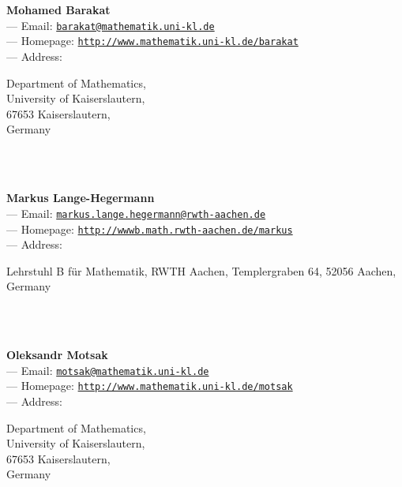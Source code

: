 \documentclass[a4paper,11pt]{report}
\begin{document}
\begin{titlepage}
\mbox{}\\
{\mbox{}\\
\small \noindent \textbf{Mohamed Barakat\\
    } --- Email: \href{mailto://barakat@mathematik.uni-kl.de} {\texttt{barakat@mathematik.uni-kl.de}}\\
 --- Homepage: \href{http://www.mathematik.uni-kl.de/~barakat} {\texttt{http://www.mathematik.uni-kl.de/\texttt{}barakat}}\\
 --- Address: \begin{minipage}[t]{8cm}\noindent
 Department of Mathematics, \\
 University of Kaiserslautern, \\
 67653 Kaiserslautern, \\
 Germany \end{minipage}
}\\
{\mbox{}\\
\small \noindent \textbf{Markus Lange-Hegermann\\
    } --- Email: \href{mailto://markus.lange.hegermann@rwth-aachen.de} {\texttt{markus.lange.hegermann@rwth-aachen.de}}\\
 --- Homepage: \href{http://wwwb.math.rwth-aachen.de/~markus} {\texttt{http://wwwb.math.rwth-aachen.de/\texttt{}markus}}\\
 --- Address: \begin{minipage}[t]{8cm}\noindent
 Lehrstuhl B f{\"u}r Mathematik, RWTH Aachen, Templergraben 64, 52056 Aachen,
Germany \end{minipage}
}\\
{\mbox{}\\
\small \noindent \textbf{Oleksandr Motsak\\
    } --- Email: \href{mailto://motsak@mathematik.uni-kl.de} {\texttt{motsak@mathematik.uni-kl.de}}\\
 --- Homepage: \href{http://www.mathematik.uni-kl.de/~motsak} {\texttt{http://www.mathematik.uni-kl.de/\texttt{}motsak}}\\
 --- Address: \begin{minipage}[t]{8cm}\noindent
 Department of Mathematics, \\
 University of Kaiserslautern, \\
 67653 Kaiserslautern, \\
 Germany \end{minipage}
}\\
\end{titlepage}
\end{document}
